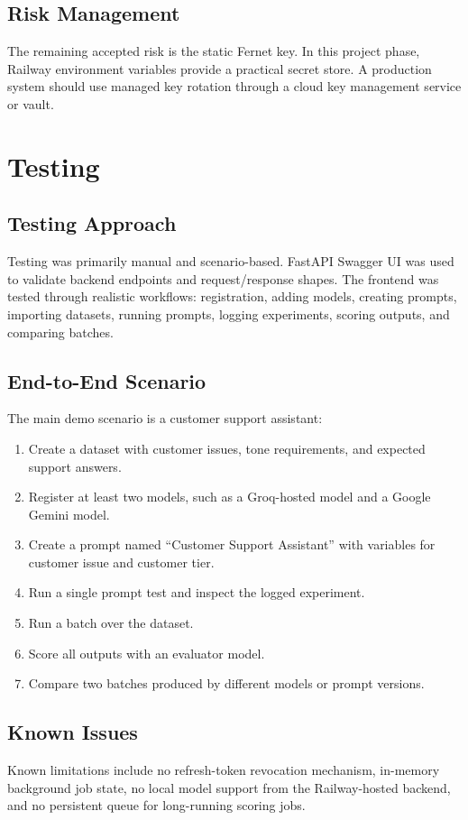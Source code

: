 \documentclass[12pt,a4paper]{report}
\begin{document}
\section{Risk Management}
The remaining accepted risk is the static Fernet key. In this project phase, Railway environment variables provide a practical secret store. A production system should use managed key rotation through a cloud key management service or vault.

\chapter{Testing}

\section{Testing Approach}
Testing was primarily manual and scenario-based. FastAPI Swagger UI was used to validate backend endpoints and request/response shapes. The frontend was tested through realistic workflows: registration, adding models, creating prompts, importing datasets, running prompts, logging experiments, scoring outputs, and comparing batches.

\section{End-to-End Scenario}
The main demo scenario is a customer support assistant:
\begin{enumerate}
  \item Create a dataset with customer issues, tone requirements, and expected support answers.
  \item Register at least two models, such as a Groq-hosted model and a Google Gemini model.
  \item Create a prompt named ``Customer Support Assistant'' with variables for customer issue and customer tier.
  \item Run a single prompt test and inspect the logged experiment.
  \item Run a batch over the dataset.
  \item Score all outputs with an evaluator model.
  \item Compare two batches produced by different models or prompt versions.
\end{enumerate}

\section{Known Issues}
Known limitations include no refresh-token revocation mechanism, in-memory background job state, no local model support from the Railway-hosted backend, and no persistent queue for long-running scoring jobs.
\end{document}
